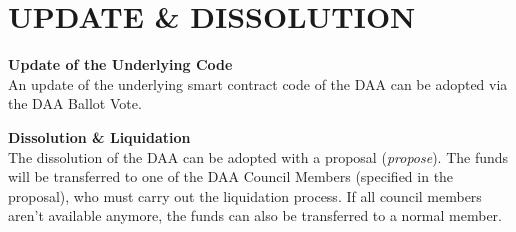 \section{UPDATE \& DISSOLUTION}\label{sec:update-&-dissolution}

\item \textbf{Update of the Underlying Code} \\
An update of the underlying smart contract code of the DAA can be adopted via the DAA Ballot Vote.

\item \textbf{Dissolution \& Liquidation} \\
The dissolution of the DAA can be adopted with a proposal (\emph{propose}).
The funds will be transferred to one of the DAA Council Members (specified in the proposal), who must carry out the liquidation process.
If all council members aren't available anymore, the funds can also be transferred to a normal member.
